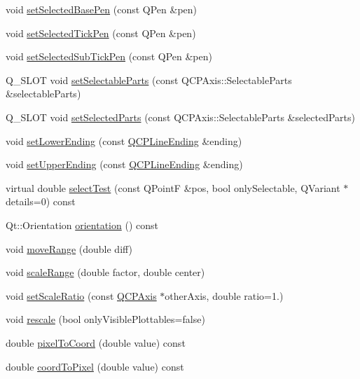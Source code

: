 \begin{DoxyCompactItemize}
\item 
void \hyperlink{classQCPAxis_aeb917a909215605b95ef2be843de1ee8}{set\-Selected\-Base\-Pen} (const \-Q\-Pen \&pen)
\item 
void \hyperlink{classQCPAxis_a8360502685eb782edbf04019c9345cdc}{set\-Selected\-Tick\-Pen} (const \-Q\-Pen \&pen)
\item 
void \hyperlink{classQCPAxis_a2a00a7166600155eac26843132eb9576}{set\-Selected\-Sub\-Tick\-Pen} (const \-Q\-Pen \&pen)
\item 
\-Q\-\_\-\-S\-L\-O\-T void \hyperlink{classQCPAxis_a513f9b9e326c505d9bec54880031b085}{set\-Selectable\-Parts} (const \-Q\-C\-P\-Axis\-::\-Selectable\-Parts \&selectable\-Parts)
\item 
\-Q\-\_\-\-S\-L\-O\-T void \hyperlink{classQCPAxis_ab9d7a69277dcbed9119b3c1f25ca19c3}{set\-Selected\-Parts} (const \-Q\-C\-P\-Axis\-::\-Selectable\-Parts \&selected\-Parts)
\item 
void \hyperlink{classQCPAxis_a08af1c72db9ae4dc8cb8a973d44405ab}{set\-Lower\-Ending} (const \hyperlink{classQCPLineEnding}{\-Q\-C\-P\-Line\-Ending} \&ending)
\item 
void \hyperlink{classQCPAxis_a69119b892fc306f651763596685aa377}{set\-Upper\-Ending} (const \hyperlink{classQCPLineEnding}{\-Q\-C\-P\-Line\-Ending} \&ending)
\item 
virtual double \hyperlink{classQCPAxis_a2877a6230920c118be65c6113089f467}{select\-Test} (const \-Q\-Point\-F \&pos, bool only\-Selectable, \-Q\-Variant $\ast$details=0) const 
\item 
\-Qt\-::\-Orientation \hyperlink{classQCPAxis_a57483f2f60145ddc9e63f3af53959265}{orientation} () const 
\item 
void \hyperlink{classQCPAxis_a18f3a68f2b691af1fd34b6593c886630}{move\-Range} (double diff)
\item 
void \hyperlink{classQCPAxis_a7072ff96fe690148f1bbcdb4f773ea1c}{scale\-Range} (double factor, double center)
\item 
void \hyperlink{classQCPAxis_af4bbd446dcaee5a83ac30ce9bcd6e125}{set\-Scale\-Ratio} (const \hyperlink{classQCPAxis}{\-Q\-C\-P\-Axis} $\ast$other\-Axis, double ratio=1.)
\item 
void \hyperlink{classQCPAxis_a499345f02ebce4b23d8ccec96e58daa9}{rescale} (bool only\-Visible\-Plottables=false)
\item 
double \hyperlink{classQCPAxis_ae9289ef7043b9d966af88eaa95b037d1}{pixel\-To\-Coord} (double value) const 
\item 
double \hyperlink{classQCPAxis_a985ae693b842fb0422b4390fe36d299a}{coord\-To\-Pixel} (double value) const 

\end{DoxyCompactItemize}
